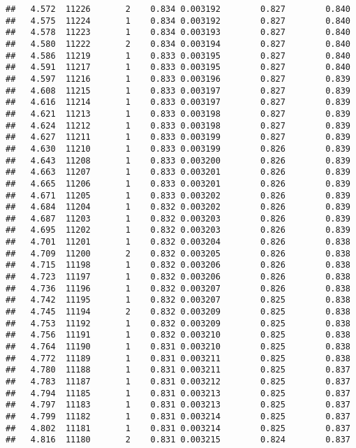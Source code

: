 \documentclass[
]{book}
\begin{document}
\begin{verbatim}
##   4.572  11226       2    0.834 0.003192        0.827        0.840
##   4.575  11224       1    0.834 0.003192        0.827        0.840
##   4.578  11223       1    0.834 0.003193        0.827        0.840
##   4.580  11222       2    0.834 0.003194        0.827        0.840
##   4.586  11219       1    0.833 0.003195        0.827        0.840
##   4.591  11217       1    0.833 0.003195        0.827        0.840
##   4.597  11216       1    0.833 0.003196        0.827        0.839
##   4.608  11215       1    0.833 0.003197        0.827        0.839
##   4.616  11214       1    0.833 0.003197        0.827        0.839
##   4.621  11213       1    0.833 0.003198        0.827        0.839
##   4.624  11212       1    0.833 0.003198        0.827        0.839
##   4.627  11211       1    0.833 0.003199        0.827        0.839
##   4.630  11210       1    0.833 0.003199        0.826        0.839
##   4.643  11208       1    0.833 0.003200        0.826        0.839
##   4.663  11207       1    0.833 0.003201        0.826        0.839
##   4.665  11206       1    0.833 0.003201        0.826        0.839
##   4.671  11205       1    0.833 0.003202        0.826        0.839
##   4.684  11204       1    0.832 0.003202        0.826        0.839
##   4.687  11203       1    0.832 0.003203        0.826        0.839
##   4.695  11202       1    0.832 0.003203        0.826        0.839
##   4.701  11201       1    0.832 0.003204        0.826        0.838
##   4.709  11200       2    0.832 0.003205        0.826        0.838
##   4.715  11198       1    0.832 0.003206        0.826        0.838
##   4.723  11197       1    0.832 0.003206        0.826        0.838
##   4.736  11196       1    0.832 0.003207        0.826        0.838
##   4.742  11195       1    0.832 0.003207        0.825        0.838
##   4.745  11194       2    0.832 0.003209        0.825        0.838
##   4.753  11192       1    0.832 0.003209        0.825        0.838
##   4.756  11191       1    0.832 0.003210        0.825        0.838
##   4.764  11190       1    0.831 0.003210        0.825        0.838
##   4.772  11189       1    0.831 0.003211        0.825        0.838
##   4.780  11188       1    0.831 0.003211        0.825        0.837
##   4.783  11187       1    0.831 0.003212        0.825        0.837
##   4.794  11185       1    0.831 0.003213        0.825        0.837
##   4.797  11183       1    0.831 0.003213        0.825        0.837
##   4.799  11182       1    0.831 0.003214        0.825        0.837
##   4.802  11181       1    0.831 0.003214        0.825        0.837
##   4.816  11180       2    0.831 0.003215        0.824        0.837

\end{verbatim}
\end{document}
